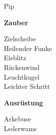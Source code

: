 \begin{heroprofile}{Pip}
\begin{herocolumns}
    \begin{herosectionbox}
      \textbf{Zauber}\par\smallskip
      Zielscheibe\\
      Heilender Funke\\
      Eisblitz\\
      Rückenwind\\
      Leuchtkugel\\
      Leichter Schritt
    \end{herosectionbox}

    \begin{herosectionbox}
      \textbf{Ausrüstung}\par\smallskip
      Arkebuse\\
      Lederwams
    \end{herosectionbox}
  \end{herocolumns}
\end{heroprofile}
